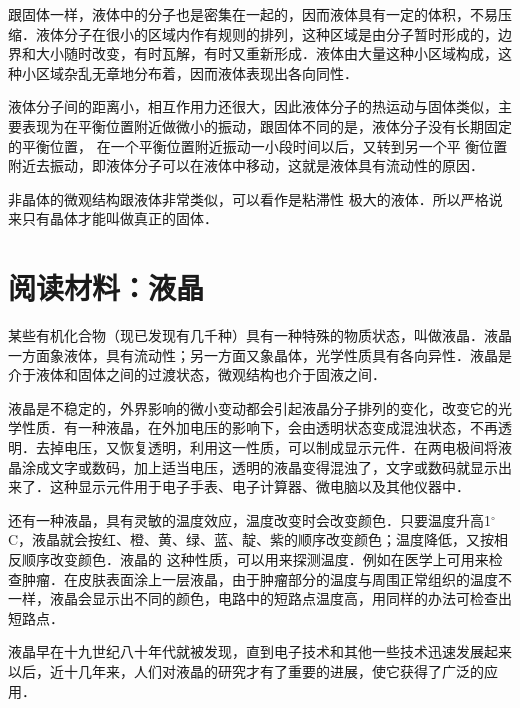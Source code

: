 跟固体一样，液体中的分子也是密集在一起的，因而液体具有一定的体积，不易压缩．液体分子在很小的区域内作有规则的排列，这种区域是由分子暂时形成的，边界和大小随时改变，有时瓦解，有时又重新形成．液体由大量这种小区域构成，这种小区域杂乱无章地分布着，因而液体表现出各向同性．

液体分子间的距离小，相互作用力还很大，因此液体分子的热运动与固体类似，主要表现为在平衡位置附近做微小的振动，跟固体不同的是，液体分子没有长期固定的平衡位置，
在一个平衡位置附近振动一小段时间以后，又转到另一个平
衡位置附近去振动，即液体分子可以在液体中移动，这就是液体具有流动性的原因．

非晶体的微观结构跟液体非常类似，可以看作是粘滞性
极大的液体．所以严格说来只有晶体才能叫做真正的固体．

\section*{阅读材料：液晶}
某些有机化合物（现已发现有几千种）具有一种特殊的物质状态，叫做液晶．液晶一方面象液体，具有流动性；另一方面又象晶体，光学性质具有各向异性．液晶是介于液体和固体之间的过渡状态，微观结构也介于固液之间．

液晶是不稳定的，外界影响的微小变动都会引起液晶分子排列的变化，改变它的光学性质．有一种液晶，在外加电压的影响下，会由透明状态变成混浊状态，不再透明．去掉电压，又恢复透明，利用这一性质，可以制成显示元件．在两电极间将液晶涂成文字或数码，加上适当电压，透明的液晶变得混浊了，文字或数码就显示出来了．这种显示元件用于电子手表、电子计算器、微电脑以及其他仪器中．

还有一种液晶，具有灵敏的温度效应，温度改变时会改变颜色．只要温度升高1$^\circ$C，液晶就会按红、橙、黄、绿、蓝、靛、紫的顺序改变颜色；温度降低，又按相反顺序改变颜色．液晶的
这种性质，可以用来探测温度．例如在医学上可用来检查肿瘤．在皮肤表面涂上一层液晶，由于肿瘤部分的温度与周围正常组织的温度不一样，液晶会显示出不同的颜色，电路中的短路点温度高，用同样的办法可检查出短路点．

液晶早在十九世纪八十年代就被发现，直到电子技术和其他一些技术迅速发展起来以后，近十几年来，人们对液晶的研究才有了重要的进展，使它获得了广泛的应用．

